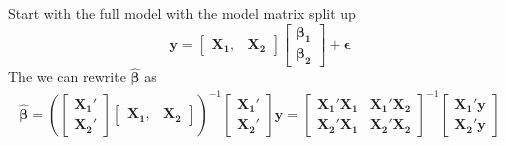 \documentclass[10pt]{article}
\begin{document}
Start with the full model with the model matrix split up
\[
\bm{y} = \begin{bmatrix} \bm{X_1}, &
  \bm{X_2} \end{bmatrix} \begin{bmatrix} \bm{\beta_1} \\
  \bm{\beta_2} \end{bmatrix} + \bm{\epsilon}
\]
The we can rewrite $\bm{\hat{\beta}}$ as
\begin{align}\label{betahat}
\bm{\hat{\beta}} = \left(\begin{bmatrix} \bm{X_1}' \\
    \bm{X_2}' \end{bmatrix} \begin{bmatrix}
  \bm{X_1}, & \bm{X_2} \end{bmatrix} \right)^{-1} \begin{bmatrix}
\bm{X_1}' \\ \bm{X_2}' \end{bmatrix}\bm{y}
= \begin{bmatrix} \bm{X_1}'\bm{X_1} & \bm{X_1}'\bm{X_2} \\
  \bm{X_2}'\bm{X_1} & \bm{X_2}'\bm{X_2} \end{bmatrix}^{-1}
\begin{bmatrix} \bm{X_1}'\bm{y} \\ \bm{X_2}'\bm{y} \end{bmatrix}
\end{align}
\end{document}
